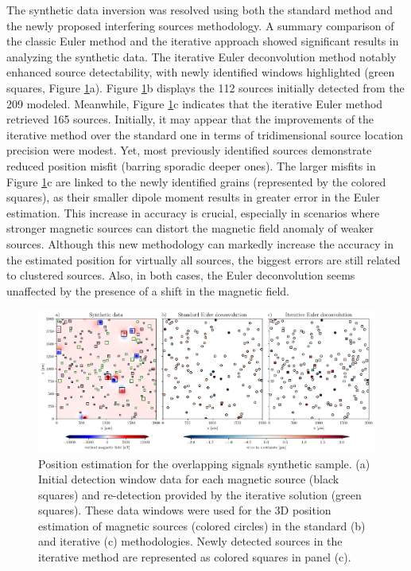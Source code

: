 The synthetic data inversion was resolved using both the standard method \citep{Souza-Junior2024} and the newly proposed interfering sources methodology. A summary comparison of the classic Euler method and the iterative approach showed significant results in analyzing the synthetic data. The iterative Euler deconvolution method notably enhanced source detectability, with newly identified windows highlighted (green squares, Figure \ref{euler2}a). Figure \ref{euler2}b displays the 112 sources initially detected from the 209 modeled. Meanwhile, Figure \ref{euler2}c indicates that the iterative Euler method retrieved 165 sources. Initially, it may appear that the improvements of the iterative method  over the standard one in terms of tridimensional source location precision were modest. Yet, most previously identified sources demonstrate reduced position misfit (barring sporadic deeper ones). The larger misfits in Figure \ref{euler2}c are linked to the newly identified grains (represented by the colored squares), as their smaller dipole moment results in greater error in the Euler estimation. This increase in accuracy is crucial, especially in scenarios where stronger magnetic sources can distort the magnetic field anomaly of weaker sources. Although this new methodology can markedly increase the accuracy in the estimated position for virtually all sources, the biggest errors are still related to clustered sources. Also, in both cases, the Euler deconvolution seems unaffected by the presence of a shift in the magnetic field.


\begin{figure}[tb!]
  \centering
  \includegraphics[width=1\linewidth]{paper/figures/euler-comparion-synthetic.png}
  \caption{
    Position estimation for the overlapping signals synthetic sample. (a) Initial detection window data for each magnetic source (black squares) and re-detection provided by the iterative solution (green squares). These data windows were used for the 3D position estimation of magnetic sources (colored circles) in the standard (b) and iterative (c) methodologies. Newly detected sources in the iterative method are represented as colored squares in panel (c).
  }
  \label{euler2}
\end{figure}

